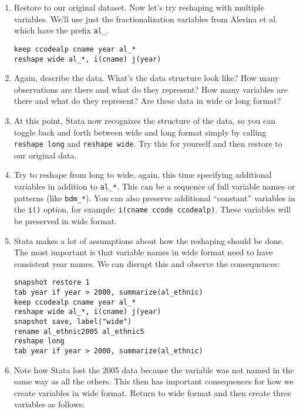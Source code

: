 \documentclass[a4paper,12pt]{article}
\begin{document}
\begin{enumerate}
\item Restore to our original dataset. Now let's try reshaping with multiple variables. We'll use just the fractionalization variables from Alesina et al. which have the prefix \texttt{al\_}.


\begin{verbatim}
keep ccodealp cname year al_*
reshape wide al_*, i(cname) j(year)
\end{verbatim}

\item Again, describe the data. What's the data structure look like? How many observations are there and what do they represent? How many variables are there and what do they represent? Are these data in wide or long format?

\item At this point, Stata now recognizes the structure of the data, so you can toggle back and forth between wide and long format simply by calling \texttt{reshape long} and \texttt{reshape wide}. Try this for yourself and then restore to our original data.

\item Try to reshape from long to wide, again, this time specifying additional variables in addition to \texttt{al\_*}. This can be a sequence of full variable names or patterns (like \texttt{bdm\_*}). You can also preserve additional ``constant'' variables in the \texttt{i()} option, for example: \texttt{i(cname ccode ccodealp)}. These variables will be preserved in wide format.

\item Stata makes a lot of assumptions about how the reshaping should be done. The most important is that variable names in wide format need to have consistent year names. We can disrupt this and observe the consequences:

\begin{verbatim}
snapshot restore 1
tab year if year > 2000, summarize(al_ethnic)
keep ccodealp cname year al_*
reshape wide al_*, i(cname) j(year)
snapshot save, label("wide")
rename al_ethnic2005 al_ethnic5
reshape long
tab year if year > 2000, summarize(al_ethnic)
\end{verbatim}

\item Note how Stata lost the 2005 data because the variable was not named in the same way as all the others. This then has important consequences for how we create variables in wide format. Return to wide format and then create three variables as follows:


\end{enumerate}
\end{document}

